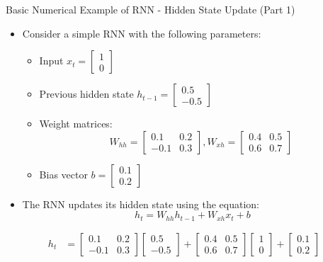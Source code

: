 \documentclass[serif, aspectratio=169]{beamer}
\begin{document}
\begin{frame}{Basic Numerical Example of RNN - Hidden State Update (Part 1)}
	\begin{itemize}
		\item Consider a simple RNN with the following parameters:
		\begin{itemize}
			\item Input \( x_t = \begin{bmatrix} 1 \\ 0 \end{bmatrix} \)
			\item Previous hidden state \( h_{t-1} = \begin{bmatrix} 0.5 \\ -0.5 \end{bmatrix} \)
			\item Weight matrices: \[
			W_{hh} = \begin{bmatrix} 0.1 & 0.2 \\ -0.1 & 0.3 \end{bmatrix}, 
			W_{xh} = \begin{bmatrix} 0.4 & 0.5 \\ 0.6 & 0.7 \end{bmatrix}
			\]
			\item Bias vector \( b = \begin{bmatrix} 0.1 \\ 0.2 \end{bmatrix} \)
		\end{itemize}
		\item The RNN updates its hidden state using the equation:
		\vspace{-5pt}
		\[
		h_t = W_{hh} h_{t-1} + W_{xh} x_t + b
		\]
	\end{itemize}
	\vspace{-12pt}
	\begin{align*}
		h_t &= \begin{bmatrix} 0.1 & 0.2 \\ -0.1 & 0.3 \end{bmatrix} \begin{bmatrix} 0.5 \\ -0.5 \end{bmatrix} + \begin{bmatrix} 0.4 & 0.5 \\ 0.6 & 0.7 \end{bmatrix} \begin{bmatrix} 1 \\ 0 \end{bmatrix} + \begin{bmatrix} 0.1 \\ 0.2 \end{bmatrix}
	\end{align*}
\end{frame}
\end{document}
